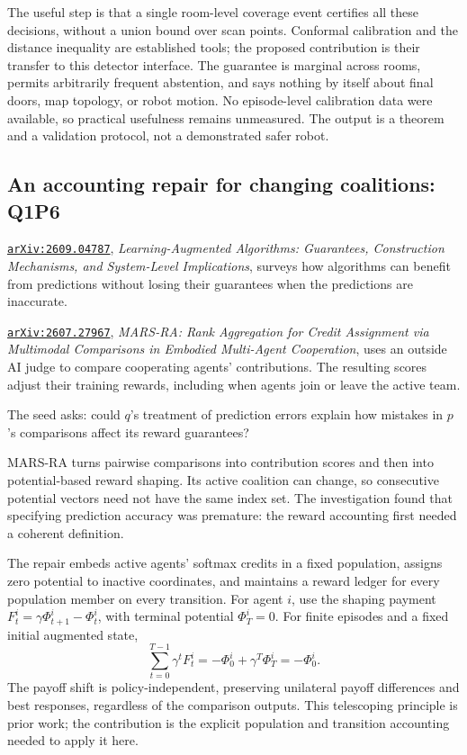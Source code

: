 \documentclass[11pt,a4paper]{article}
\renewenvironment{quote}{\tcolorbox[pairpanel]}{\endtcolorbox}
\newcommand{\pl}[1]{\noindent\llap{\makebox[1.5em][l]{\color{accent}\(#1\)}}}
\newcommand{\file}[1]{\texttt{#1}}
\begin{document}
The useful step is that a single room-level coverage event certifies all these
decisions, without a union bound over scan points. Conformal calibration and the
distance inequality are established tools; the proposed contribution is their
transfer to this detector interface. The guarantee is marginal across rooms,
permits arbitrarily frequent abstention, and says nothing by itself about final
doors, map topology, or robot motion. No episode-level calibration data were
available, so practical usefulness remains unmeasured. The output is a theorem
and a validation protocol, not a demonstrated safer robot.

\subsection{An accounting repair for changing coalitions: Q1P6}

\begin{quote}
\pl{q}\href{https://arxiv.org/abs/2609.04787}{\file{arXiv:2609.04787}},
\emph{Learning-Augmented Algorithms: Guarantees, Construction Mechanisms, and
System-Level Implications}, surveys how algorithms can benefit from predictions
without losing their guarantees when the predictions are inaccurate.

\pl{p}\href{https://arxiv.org/abs/2607.27967}{\file{arXiv:2607.27967}},
\emph{MARS-RA: Rank Aggregation for Credit Assignment via Multimodal Comparisons
in Embodied Multi-Agent Cooperation}, uses an outside AI judge to compare
cooperating agents' contributions. The resulting scores adjust their training
rewards, including when agents join or leave the active team.

The seed asks: could \(q\)'s treatment of prediction errors explain how mistakes
in \(p\)'s comparisons affect its reward guarantees?
\end{quote}

MARS-RA turns pairwise comparisons into contribution scores and then into
potential-based reward shaping. Its active coalition can change, so consecutive
potential vectors need not have the same index set. The investigation found that
specifying prediction accuracy was premature: the reward accounting first needed
a coherent definition.

The repair embeds active agents' softmax credits in a fixed population, assigns
zero potential to inactive coordinates, and maintains a reward ledger for every
population member on every transition. For agent $i$, use the shaping payment
$F_t^i=\gamma\Phi_{t+1}^i-\Phi_t^i$, with terminal potential $\Phi_T^i=0$. For
finite episodes and a fixed initial augmented state,
\begin{equation}
 \sum_{t=0}^{T-1}\gamma^t F_t^i
 =-\Phi_0^i+\gamma^T\Phi_T^i
 =-\Phi_0^i.
 \label{eq:pilot-shaping}
\end{equation}
The payoff shift is policy-independent, preserving unilateral payoff differences
and best responses, regardless of the comparison outputs. This telescoping
principle is prior work; the contribution is the explicit population and
transition accounting needed to apply it here.
\end{document}
